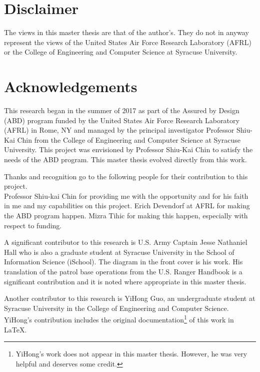 \documentclass[../main/main.tex]{subfiles}
\begin{document}

\section*{Disclaimer}
The views in this master thesis are that of the author's.  They do not in anyway represent the views of the United States Air Force Research Laboratory (AFRL)  or  the College of Engineering and Computer Science at Syracuse University. 
\cleardoublepage

\section*{Acknowledgements}
This research began in the summer of 2017 as part of the Assured by Design (ABD) program funded by the United States Air Force Research Laboratory (AFRL) in Rome, NY and managed by the principal investigator Professor Shiu-Kai Chin from the College of Engineering and Computer Science at Syracuse University.  This project was envisioned by Professor Shiu-Kai Chin to satisfy the needs of the ABD program.  This master thesis evolved directly from this work.

Thanks and recognition go to the following people for their contribution to this project.\\
Professor Shiu-kai Chin for providing me with the opportunity and for his faith in me and my capabilities on this project.  Erich Devendorf at AFRL for making the ABD program happen. Mizra Tihic for making this happen, especially with respect to funding.

A significant contributor to this research is U.S. Army Captain Jesse Nathaniel Hall who is also a graduate student at Syracuse University in the School of Information Science (iSchool).  The diagram in the front cover is his work.  His translation of the patrol base operations from the U.S. Ranger Handbook is a significant contribution and it is noted where appropriate in this master thesis.

Another contributor to this research is YiHong Guo, an undergraduate student at Syracuse University in the College of Engineering and Computer Science. YiHong's contribution includes the original documentation\footnote{YiHong's work does not appear in this master thesis.  However, he was very helpful and deserves some credit.} of this work in LaTeX.  
\end{document}
